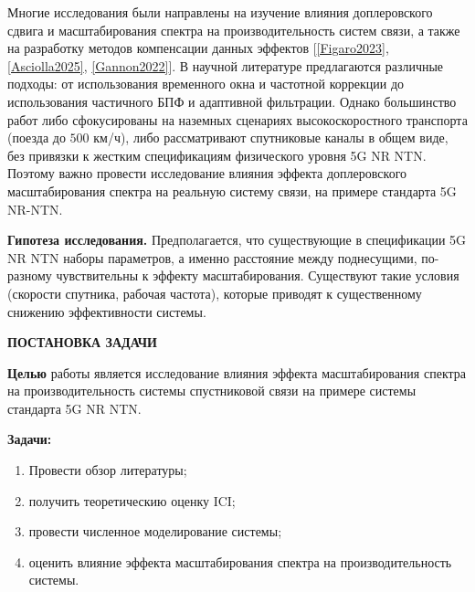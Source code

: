 Многие исследования были направлены на изучение влияния доплеровского сдвига и масштабирования спектра
на производительность систем связи, а также на разработку методов компенсации данных эффектов [\ref{Figaro2023}, \ref{Asciolla2025}, \ref{Gannon2022}].
В научной литературе предлагаются различные подходы: от использования временного окна
и частотной коррекции до использования частичного БПФ и адаптивной фильтрации.
Однако большинство работ либо сфокусированы на наземных сценариях высокоскоростного транспорта (поезда до $500$ км/ч),
либо рассматривают спутниковые каналы в общем виде, без привязки к жестким спецификациям
физического уровня 5G NR NTN. Поэтому важно провести исследование влияния эффекта доплеровского
масштабирования спектра на реальную систему связи, на примере стандарта 5G NR-NTN.

\textbf{Гипотеза исследования.} Предполагается, что существующие в спецификации 5G NR NTN наборы параметров,
а именно расстояние между поднесущими, по-разному чувствительны к эффекту масштабирования.
Существуют такие условия (скорости спутника, рабочая частота), которые приводят к существенному снижению эффективности системы.


\newpage
\begin{center}
  \textbf{\large ПОСТАНОВКА ЗАДАЧИ}
\end{center}

\textbf{Целью} работы является исследование влияния эффекта масштабирования спектра на 
производительность системы спустниковой связи на примере системы стандарта 5G NR NTN.

\textbf{Задачи:}
\begin{enumerate}
    \item Провести обзор литературы;
    \item получить теоретическию оценку ICI;
    \item провести численное моделирование системы;
    \item оценить влияние эффекта масштабирования спектра на производительность системы.
\end{enumerate}

